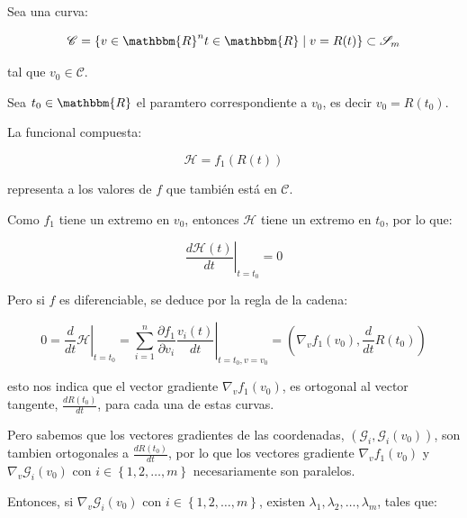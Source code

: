         Sea una curva:

        \begin{equation}
            \mathscr{C} = \left\{ v\in \mathbbm{R}^n t \in \mathbbm{R} \mid v = R(t) \right\} \subset \mathscr{S}_m
        \end{equation}

        tal que $v_0 \in \mathscr{C}$.

        Sea $t_0 \in \mathbbm{R}$ el paramtero correspondiente a $v_0$, es decir $v_0 = R(t_0)$.

        La funcional compuesta:

        \begin{equation}
            \mathscr{H} = f_1(R(t))
        \end{equation}

        representa a los valores de $f$  que también está en $\mathscr{C}$.

        Como $f_1$ tiene un extremo en $v_0$, entonces $\mathscr{H}$ tiene un extremo en $t_0$, por lo que:

        \begin{equation}
            \left. \frac{d \mathscr{H}(t)}{dt} \right|_{t=t_0} = 0
        \end{equation}

        Pero si $f$ es diferenciable, se deduce por la regla de la cadena:

        \begin{equation}
            0 = \left. \frac{d}{dt} \mathscr{H} \right|_{t=t_0} = \left. \sum_{i=1}^n \frac{\partial f_1}{\partial v_i} \frac{v_i(t)}{dt} \right|_{t=t_0, v=v_0} = \left( \nabla_v f_1(v_0), \frac{d}{dt} R(t_0) \right)
        \end{equation}

        esto nos indica que el vector gradiente $\nabla_v f_1(v_0)$, es ortogonal al vector tangente, $\frac{d R(t_0)}{dt}$, para cada una de estas curvas.

        Pero sabemos que los vectores gradientes de las coordenadas, $\left( \mathscr{G}_i, \mathscr{G}_i(v_0) \right)$, son tambien ortogonales a $\frac{d R(t_0)}{dt}$, por lo que los vectores gradiente $\nabla_v f_1(v_0)$ y $\nabla_v \mathscr{G}_i(v_0)$ con $i \in \left\{ 1, 2, \dots, m \right\}$ necesariamente son paralelos.

        Entonces, si $\nabla_v \mathscr{G}_i(v_0)$ con $i \in \left\{ 1, 2, \dots, m \right\}$, existen $\lambda_1, \lambda_2, \dots, \lambda_m$, tales que:

